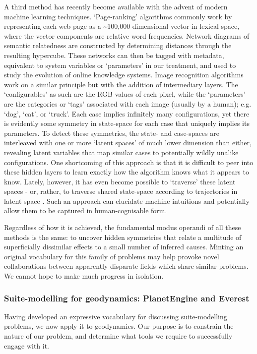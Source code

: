 \documentclass[a4paper,11pt,oneside]{book}
\begin{document}
A third method has recently become available with the advent of modern machine learning techniques. `Page-ranking' algorithms commonly work by representing each web page as a {\textasciitilde}100,000-dimensional vector in lexical space, where the vector components are relative word frequencies. Network diagrams of semantic relatedness are constructed by determining distances through the resulting hypercube. These networks can then be tagged with metadata, equivalent to system variables or `parameters' in our treatment, and used to study the evolution of online knowledge systems. Image recognition algorithms work on a similar principle but with the addition of intermediary layers. The `configurables' as such are the RGB values of each pixel, while the `parameters' are the categories or `tags' associated with each image (usually by a human); e.g. `dog', `cat', or `truck'. Each case implies infinitely many configurations, yet there is evidently some symmetry in state-space for each case that uniquely implies its parameters. To detect these symmetries, the state- and case-spaces are interleaved with one or more `latent spaces' of much lower dimension than either, revealing latent variables that map similar cases to potentially wildly unalike configurations. One shortcoming of this approach is that it is difficult to peer into these hidden layers to learn exactly how the algorithm knows what it appears to know. Lately, however, it has even become possible to `traverse' these latent spaces - or, rather, to traverse shared state-space according to trajectories in latent space \cite{Mahendran2015-og}. Such an approach can elucidate machine intuitions and potentially allow them to be captured in human-cognisable form.

Regardless of how it is achieved, the fundamental modus operandi of all these methods is the same: to uncover hidden symmetries that relate a multitude of superficially dissimilar effects to a small number of inferred causes. Minting an original vocabulary for this family of problems may help provoke novel collaborations between apparently disparate fields which share similar problems. We cannot hope to make much progress in isolation.

\subsubsection{Suite-modelling for geodynamics: PlanetEngine and Everest}

Having developed an expressive vocabulary for discussing suite-modelling problems, we now apply it to geodynamics. Our purpose is to constrain the nature of our problem, and determine what tools we require to successfully engage with it.
\end{document}

